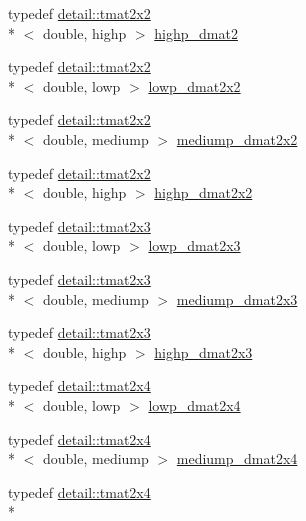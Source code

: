 \begin{DoxyCompactItemize}
\item 
typedef \hyperlink{structglm_1_1detail_1_1tmat2x2}{detail\-::tmat2x2}\\*
$<$ double, highp $>$ \hyperlink{group__core__precision_ga9b158b3b722fe991bb66f7e65f136e68}{highp\-\_\-dmat2}
\item 
typedef \hyperlink{structglm_1_1detail_1_1tmat2x2}{detail\-::tmat2x2}\\*
$<$ double, lowp $>$ \hyperlink{group__core__precision_ga68b486ff22814c1a3781378513a9fcc0}{lowp\-\_\-dmat2x2}
\item 
typedef \hyperlink{structglm_1_1detail_1_1tmat2x2}{detail\-::tmat2x2}\\*
$<$ double, mediump $>$ \hyperlink{group__core__precision_ga88ddb4188060ab00fee67c9840f4417e}{mediump\-\_\-dmat2x2}
\item 
typedef \hyperlink{structglm_1_1detail_1_1tmat2x2}{detail\-::tmat2x2}\\*
$<$ double, highp $>$ \hyperlink{group__core__precision_gaa5e35f6570d394c1cd34f411a473220c}{highp\-\_\-dmat2x2}
\item 
typedef \hyperlink{structglm_1_1detail_1_1tmat2x3}{detail\-::tmat2x3}\\*
$<$ double, lowp $>$ \hyperlink{group__core__precision_ga2c7432984a35cf72050870a54485ef35}{lowp\-\_\-dmat2x3}
\item 
typedef \hyperlink{structglm_1_1detail_1_1tmat2x3}{detail\-::tmat2x3}\\*
$<$ double, mediump $>$ \hyperlink{group__core__precision_ga734e988edf759c7012c443014acb6674}{mediump\-\_\-dmat2x3}
\item 
typedef \hyperlink{structglm_1_1detail_1_1tmat2x3}{detail\-::tmat2x3}\\*
$<$ double, highp $>$ \hyperlink{group__core__precision_gafec7367665f006f2a7643103c5eddc38}{highp\-\_\-dmat2x3}
\item 
typedef \hyperlink{structglm_1_1detail_1_1tmat2x4}{detail\-::tmat2x4}\\*
$<$ double, lowp $>$ \hyperlink{group__core__precision_gac2285cef559b0dc35cb9a7f22e6a2dd8}{lowp\-\_\-dmat2x4}
\item 
typedef \hyperlink{structglm_1_1detail_1_1tmat2x4}{detail\-::tmat2x4}\\*
$<$ double, mediump $>$ \hyperlink{group__core__precision_gadb60bf60ef2b8da4a28a372b2bcca3a3}{mediump\-\_\-dmat2x4}
\item 
typedef \hyperlink{structglm_1_1detail_1_1tmat2x4}{detail\-::tmat2x4}\\*

\end{DoxyCompactItemize}

